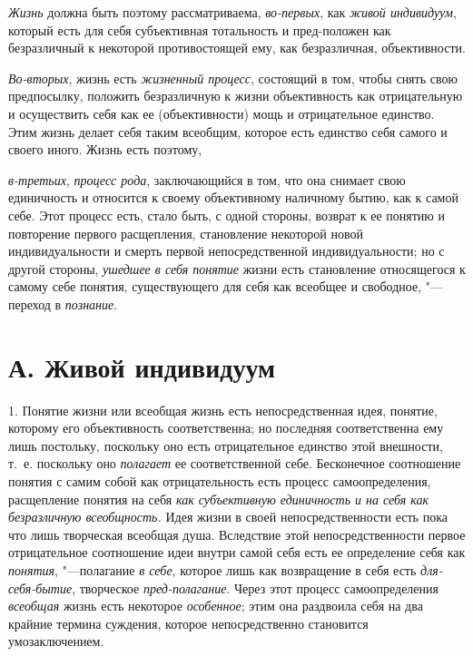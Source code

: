 {\em Жизнь} должна быть
поэтому рассматриваема,
{\em во-первых}, как
{\em живой индивидуум},
который есть для себя субъективная тотальность и пред-положен
как безразличный к некоторой противостоящей ему, как безразличная,
объективности.

{\em Во-вторых}, жизнь есть
{\em жизненный процесс},
состоящий в том, чтобы снять свою предпосылку, положить
безразличную к жизни объективность как отрицательную и осуществить себя как
ее (объективности) мощь и отрицательное единство. Этим жизнь делает себя
таким всеобщим, которое есть единство себя самого и своего иного. Жизнь
есть поэтому,

{\em в-третьих},
{\em процесс рода},
заключающийся в том, что она снимает свою единичность и
относится к своему объективному наличному бытию, как к самой себе. Этот
процесс есть, стало быть, с одной стороны, возврат к ее понятию и
повторение первого расщепления, становление некоторой новой
индивидуальности и смерть первой непосредственной индивидуальности; но с
другой стороны, {\em ушедшее в себя
понятие} жизни есть становление относящегося к самому себе
понятия, существующего для себя как всеобщее и свободное, "---
переход в
{\em познание}.

\section[А. Живой индивидуум]{А. Живой индивидуум}
1. Понятие жизни или всеобщая жизнь есть непосредственная
идея, понятие, которому его объективность соответственна; но последняя
соответственна ему лишь постольку, поскольку оно есть отрицательное
единство этой внешности, т.~е. поскольку оно
{\em полагает} ее
соответственной себе. Бесконечное соотношение понятия с самим собой как
отрицательность есть процесс самоопределения, расщепление понятия на себя
{\em как субъективную единичность и на
себя как безразличную всеобщность.} Идея жизни в своей
непосредственности есть пока что лишь творческая всеобщая душа. Вследствие
этой непосредственности первое отрицательное соотношение идеи внутри самой
себя есть ее определение себя как
{\em понятия}, "---полагание
{\em в себе}, которое
лишь как возвращение в себя есть
{\em для-себя-бытие},
творческое
{\em пред-полагание}.
Через этот процесс самоопределения
{\em всеобщая} жизнь есть
некоторое {\em особенное};
этим она раздвоила себя на два крайние термина суждения,
которое непосредственно становится умозаключением.

